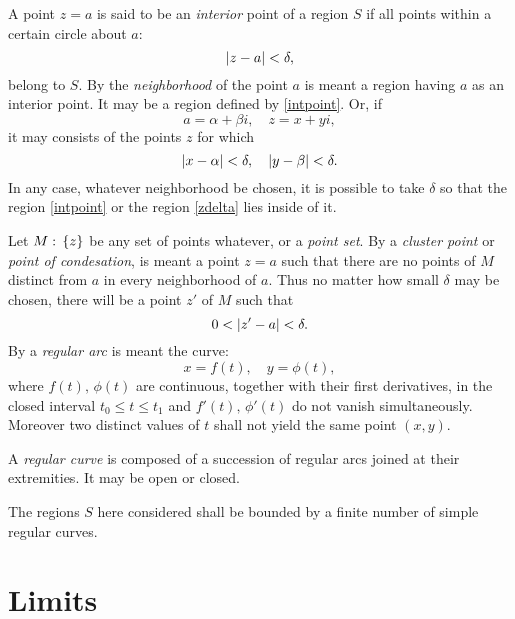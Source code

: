\documentclass[twosided]{memoir}
\begin{document}
A point $z=a$ is said to be an \emph{interior} point of a region $S$ if all points within a certain circle about $a$:
\begin{equation}\label{intpoint}
\abs*{z-a} <\delta 
,\end{equation} belong to $S$. By the \emph{neighborhood} of the point $a$ is meant a region having $a$ as an interior point. It may be a region defined by \ref{intpoint}. Or, if
\[
a=\alpha +\beta i, \quad z=x+yi
,\] it may consists of the points $z$ for which
\begin{equation}\label{zdelta}
\abs*{x-\alpha } <\delta , \quad \abs*{y-\beta} <\delta.
\end{equation} In any case, whatever neighborhood be chosen, it is possible to take $\delta $ so that the region \ref{intpoint} or the region \ref{zdelta} lies inside of it. 

Let $M: \, \cbr*{z} $ be any set of points whatever, or a \emph{point set}. By a \emph{cluster point} or \emph{point of condesation}, is meant a point $z=a$ such that there are no points of $M$ distinct from $a$ in every neighborhood of $a$. Thus no matter how small $\delta $ may be chosen, there will be a point $z'$ of $M$ such that
\[
0<\abs*{z'-a} <\delta 
.\] By a \emph{regular arc} is meant the curve:
\[
	x=f(t), \quad y=\phi (t)
,\] where $f(t), \, \phi (t)$ are continuous, together with their first derivatives, in the closed interval $t_0\le t\le t_1$ and $f'(t), \, \phi '(t)$ do not vanish simultaneously. Moreover two distinct values of $t$ shall not yield the same point $(x,y)$.

A \emph{regular curve} is composed of a succession of regular arcs joined at their extremities. It may be open or closed.

The regions $S$ here considered shall be bounded by a finite number of simple regular curves. 

\section{Limits}
\end{document}
